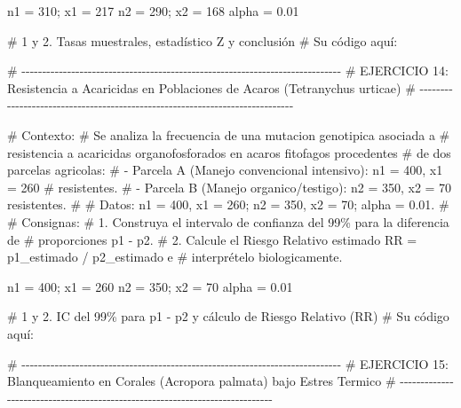 \documentclass[
  spanish,
  letterpaper,
  DIV=11,
  numbers=noendperiod]{scrreprt}
\newenvironment{Shaded}{\begin{snugshade}}{\end{snugshade}}
\newcommand{\CommentTok}[1]{\textcolor[rgb]{0.37,0.37,0.37}{#1}}
\newcommand{\DecValTok}[1]{\textcolor[rgb]{0.68,0.00,0.00}{#1}}
\newcommand{\FloatTok}[1]{\textcolor[rgb]{0.68,0.00,0.00}{#1}}
\newcommand{\NormalTok}[1]{\textcolor[rgb]{0.00,0.23,0.31}{#1}}
\newcommand{\OtherTok}[1]{\textcolor[rgb]{0.00,0.23,0.31}{#1}}
\begin{document}
\begin{Shaded}
\begin{Highlighting}[]
\NormalTok{n1 }\OtherTok{=} \DecValTok{310}\NormalTok{; x1 }\OtherTok{=} \DecValTok{217}
\NormalTok{n2 }\OtherTok{=} \DecValTok{290}\NormalTok{; x2 }\OtherTok{=} \DecValTok{168}
\NormalTok{alpha }\OtherTok{=} \FloatTok{0.01}

\CommentTok{\# 1 y 2. Tasas muestrales, estadístico Z y conclusión}
\CommentTok{\# Su código aquí:}



\CommentTok{\# {-}{-}{-}{-}{-}{-}{-}{-}{-}{-}{-}{-}{-}{-}{-}{-}{-}{-}{-}{-}{-}{-}{-}{-}{-}{-}{-}{-}{-}{-}{-}{-}{-}{-}{-}{-}{-}{-}{-}{-}{-}{-}{-}{-}{-}{-}{-}{-}{-}{-}{-}{-}{-}{-}{-}{-}{-}{-}{-}{-}{-}{-}{-}{-}{-}{-}{-}{-}{-}{-}{-}{-}{-}{-}{-}{-}{-}}
\CommentTok{\# EJERCICIO 14: Resistencia a Acaricidas en Poblaciones de Acaros (Tetranychus urticae)}
\CommentTok{\# {-}{-}{-}{-}{-}{-}{-}{-}{-}{-}{-}{-}{-}{-}{-}{-}{-}{-}{-}{-}{-}{-}{-}{-}{-}{-}{-}{-}{-}{-}{-}{-}{-}{-}{-}{-}{-}{-}{-}{-}{-}{-}{-}{-}{-}{-}{-}{-}{-}{-}{-}{-}{-}{-}{-}{-}{-}{-}{-}{-}{-}{-}{-}{-}{-}{-}{-}{-}{-}{-}{-}{-}{-}{-}{-}{-}{-}}

\CommentTok{\# Contexto:}
\CommentTok{\# Se analiza la frecuencia de una mutacion genotipica asociada a}
\CommentTok{\# resistencia a acaricidas organofosforados en acaros fitofagos procedentes}
\CommentTok{\# de dos parcelas agricolas:}
\CommentTok{\#   {-} Parcela A (Manejo convencional intensivo): n1 = 400, x1 = 260}
\CommentTok{\#     resistentes.}
\CommentTok{\#   {-} Parcela B (Manejo organico/testigo): n2 = 350, x2 = 70 resistentes.}
\CommentTok{\#}
\CommentTok{\# Datos: n1 = 400, x1 = 260; n2 = 350, x2 = 70; alpha = 0.01.}
\CommentTok{\#}
\CommentTok{\# Consignas:}
\CommentTok{\# 1. Construya el intervalo de confianza del 99\% para la diferencia de}
\CommentTok{\#    proporciones p1 {-} p2.}
\CommentTok{\# 2. Calcule el Riesgo Relativo estimado RR = p1\_estimado / p2\_estimado e}
\CommentTok{\#    interprételo biologicamente.}

\NormalTok{n1 }\OtherTok{=} \DecValTok{400}\NormalTok{; x1 }\OtherTok{=} \DecValTok{260}
\NormalTok{n2 }\OtherTok{=} \DecValTok{350}\NormalTok{; x2 }\OtherTok{=} \DecValTok{70}
\NormalTok{alpha }\OtherTok{=} \FloatTok{0.01}

\CommentTok{\# 1 y 2. IC del 99\% para p1 {-} p2 y cálculo de Riesgo Relativo (RR)}
\CommentTok{\# Su código aquí:}



\CommentTok{\# {-}{-}{-}{-}{-}{-}{-}{-}{-}{-}{-}{-}{-}{-}{-}{-}{-}{-}{-}{-}{-}{-}{-}{-}{-}{-}{-}{-}{-}{-}{-}{-}{-}{-}{-}{-}{-}{-}{-}{-}{-}{-}{-}{-}{-}{-}{-}{-}{-}{-}{-}{-}{-}{-}{-}{-}{-}{-}{-}{-}{-}{-}{-}{-}{-}{-}{-}{-}{-}{-}{-}{-}{-}{-}{-}{-}{-}}
\CommentTok{\# EJERCICIO 15: Blanqueamiento en Corales (Acropora palmata) bajo Estres Termico}
\CommentTok{\# {-}{-}{-}{-}{-}{-}{-}{-}{-}{-}{-}{-}{-}{-}{-}{-}{-}{-}{-}{-}{-}{-}{-}{-}{-}{-}{-}{-}{-}{-}{-}{-}{-}{-}{-}{-}{-}{-}{-}{-}{-}{-}{-}{-}{-}{-}{-}{-}{-}{-}{-}{-}{-}{-}{-}{-}{-}{-}{-}{-}{-}{-}{-}{-}{-}{-}{-}{-}{-}{-}{-}{-}{-}{-}{-}{-}{-}}


\end{Highlighting}
\end{Shaded}
\end{document}
